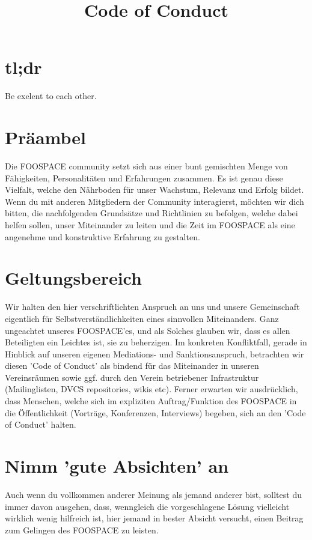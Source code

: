 \documentclass[10pt,a4paper]{article}
\begin{document}
\title{Code of Conduct}
\section*{tl;dr}
Be exelent to each other.

\section*{Präambel}
Die FOOSPACE community setzt sich aus einer bunt gemischten Menge von
Fähigkeiten, Personalitäten und Erfahrungen zusammen. Es ist genau diese
Vielfalt, welche den Nährboden für unser Wachstum, Relevanz und Erfolg bildet.
Wenn du mit anderen Mitgliedern der Community interagierst, möchten wir dich
bitten, die nachfolgenden Grundsätze und Richtlinien zu befolgen, welche dabei helfen sollen,
unser Miteinander zu leiten und die Zeit im FOOSPACE als eine angenehme und
konstruktive Erfahrung zu gestalten.

\section*{Geltungsbereich}
Wir halten den hier verschriftlichten Anspruch an uns und unsere Gemeinschaft
eigentlich für Selbstverständlichkeiten eines sinnvollen Miteinanders. Ganz
ungeachtet unseres FOOSPACE'es, und als Solches glauben wir, dass es allen
Beteiligten ein Leichtes ist, sie zu beherzigen. Im konkreten Konfliktfall,
gerade in Hinblick auf unseren eigenen Mediations- und Sanktionsanspruch,
betrachten wir diesen 'Code of Conduct' als bindend für das Miteinander in
unseren Vereinsräumen sowie ggf. durch den Verein betriebener Infrastruktur
(Mailinglisten, DVCS repositories, wikis etc). Ferner erwarten wir ausdrücklich,
dass Menschen, welche sich im expliziten Auftrag/Funktion des FOOSPACE in die
Öffentlichkeit (Vorträge, Konferenzen, Interviews) begeben, sich an den 'Code of
Conduct' halten.

\section{Nimm 'gute Absichten' an}
Auch wenn du vollkommen anderer Meinung als jemand anderer bist, solltest du
immer davon ausgehen, dass, wenngleich die vorgeschlagene Lösung vielleicht
wirklich wenig hilfreich ist, hier jemand in bester Absicht versucht, einen
Beitrag zum Gelingen des FOOSPACE zu leisten.
\end{document}
